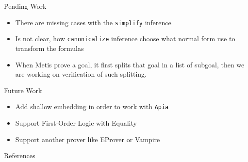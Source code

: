 \documentclass[xetex, hyperref={pdfpagelabels=false}]{beamer}
\begin{document}
\begin{frame}[label=pending-work]{Pending Work}
\begin{itemize}
\item There are missing cases with the \texttt{simplify} inference
\item Is not clear, how  \texttt{canonicalize} inference choose what
normal form use to transform the formulas
\item When Metis prove a goal, it first splits that goal in a list of
subgoal, then we are working on verification of such splitting.
\end{itemize}
\end{frame}

\begin{frame}[label=future-work]{Future Work}
\begin{itemize}
  \item Add shallow embedding in order to work with \texttt{Apia}
  \item Support First-Order Logic with Equality
  \item Support another prover like EProver or Vampire
\end{itemize}
\end{frame}


\begin{frame}[label=references]{References}
\printbibliography
\end{frame}
\end{document}
